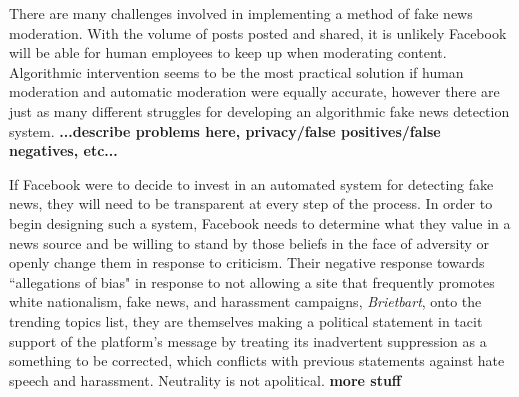 \documentclass[12pt]{article}
\begin{document}
There are many challenges involved in implementing a method of fake news moderation. With the volume of posts posted and shared, it is unlikely Facebook will be able for human employees to keep up when moderating content. Algorithmic intervention seems to be the most practical solution if human moderation and automatic moderation were equally accurate, however there are just as many different struggles for developing an algorithmic fake news detection system. \textbf{...describe problems here, privacy/false positives/false negatives, etc...}

If Facebook were to decide to invest in an automated system for detecting fake news, they will need to be transparent at every step of the process. In order to begin designing such a system, Facebook needs to determine what they value in a news source and be willing to stand by those beliefs in the face of adversity or openly change them in response to criticism. Their negative response towards ``allegations of bias" in response to not allowing a site that frequently promotes white nationalism, fake news, and harassment campaigns, \textit{Brietbart}, onto the trending topics list, they are themselves making a political statement in tacit support of the platform's message by treating its inadvertent suppression as a something to be corrected, which conflicts with previous statements against hate speech and harassment. Neutrality is not apolitical. \textbf{more stuff}

\newpage
%
%
\printbibliography
\end{document}
